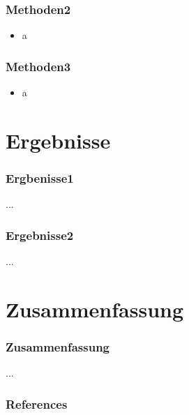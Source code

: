 \documentclass[student]{LSRslides}
\begin{document}
\begin{frame}
	\frametitle{Methoden2}
	\begin{itemize}
		\item a
	\end{itemize}
\end{frame}

\begin{frame}
	\frametitle{Methoden3}
	\begin{itemize}
		\item a
	\end{itemize}
\end{frame}

\section{Ergebnisse}

\begin{frame}
	\frametitle{Ergbenisse1}
	...
\end{frame}

\begin{frame}
	\frametitle{Ergebnisse2}
	...
\end{frame}

\section{Zusammenfassung}

\begin{frame}
	\frametitle{Zusammenfassung}
	...
\end{frame}
\appendix
\begin{frame}
	\frametitle{References}
	\printbibliography
\end{frame}
\end{document}
